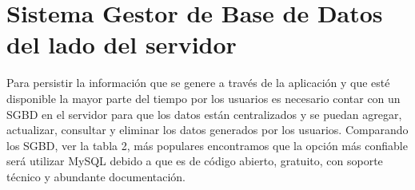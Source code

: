 	
	
	\section{Sistema Gestor de Base de Datos del lado del servidor}
	\noindent Para persistir la información que se genere a través de la aplicación y que esté disponible la mayor parte del tiempo por los usuarios es necesario contar con un SGBD en el servidor para que los datos están centralizados y se puedan agregar, actualizar, consultar y eliminar los datos generados por los usuarios. Comparando los SGBD, ver la tabla 2, más populares encontramos que la opción más confiable será utilizar MySQL debido a que es de código abierto, gratuito, con soporte técnico y abundante documentación. 
	
